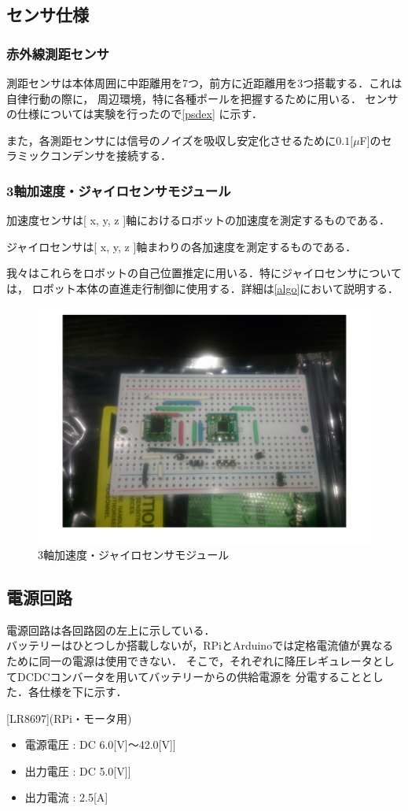 \documentclass[10pt,a4j]{jarticle}
\begin{document}
\subsection{センサ仕様}
\subsubsection{赤外線測距センサ}  
測距センサは本体周囲に中距離用を7つ，前方に近距離用を3つ搭載する．これは自律行動の際に，
周辺環境，特に各種ポールを把握するために用いる． センサの仕様については実験を行ったので\ref{psdex}
 に示す．

また，各測距センサには信号のノイズを吸収し安定化させるために$0.1[\mu $F]のセラミックコンデンサを接続する．

\subsubsection{3軸加速度・ジャイロセンサモジュール}
加速度センサは[ x, y, z ]軸におけるロボットの加速度を測定するものである．

ジャイロセンサは[ x, y, z ]軸まわりの各加速度を測定するものである．

我々はこれらをロボットの自己位置推定に用いる．特にジャイロセンサについては，
ロボット本体の直進走行制御に使用する．詳細は\ref{algo}において説明する．
\begin{figure}[b]
 \centering
 \includegraphics[width=0.4\hsize]{jairo.pdf}
    \caption{3軸加速度・ジャイロセンサモジュール}
    \label{jairo}
\end{figure}
\subsection{電源回路}
電源回路は各回路図の左上に示している．\\
バッテリーはひとつしか搭載しないが，RPiとArduinoでは定格電流値が異なるために同一の電源は使用できない．
そこで，それぞれに降圧レギュレータとしてDCDCコンバータを用いてバッテリーからの供給電源を
分電することとした．各仕様を下に示す．

[LR8697](RPi・モータ用)
\begin{itemize}
 \item 電源電圧 : DC 6.0[V]$〜$42.0[V]]
 \item 出力電圧 : DC 5.0[V]]
 \item 出力電流 : 2.5[A]
\end{itemize}
\end{document}
